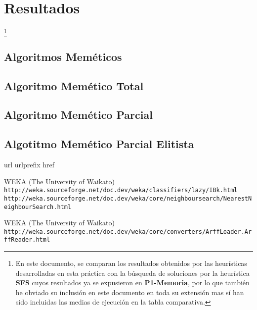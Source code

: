 \documentclass[a4paper, 11pt]{article}
\begin{document}
	\section{Resultados}\footnote{En este documento, se comparan los resultados obtenidos por las
	heurísticas desarrolladas en esta práctica con la búsqueda de soluciones por la heurística
	\textbf{SFS} cuyos resultados ya se expusieron en \textbf{P1-Memoria}, por lo que también he
	obviado su inclusión en este documento en toda su extensión mas sí han sido incluidas las medias
	de ejecución en la tabla comparativa.}
	
		\subsection{Algoritmos Meméticos}
		\subsection{Algoritmo Memético Total}
		\subsection{Algoritmo Memético Parcial}
		\subsection{Algotitmo Memético Parcial Elitista}
		
	
	
	\newpage
	
	\begin{thebibliography}{10}
	\expandafter\ifx\csname url\endcsname\relax
	  \def\url#1{\texttt{#1}}\fi
	\expandafter\ifx\csname urlprefix\endcsname\relax\def\urlprefix{URL }\fi
	\expandafter\ifx\csname href\endcsname\relax
	  \def\href#1#2{#2} \def\path#1{#1}\fi
	
	WEKA (The University of Waikato)\\
	  \url{http://weka.sourceforge.net/doc.dev/weka/classifiers/lazy/IBk.html}\\
	  \url{http://weka.sourceforge.net/doc.dev/weka/core/neighboursearch/NearestNeighbourSearch.html}
	  
  	WEKA (The University of Waikato)\\
	  \url{http://weka.sourceforge.net/doc.dev/weka/core/converters/ArffLoader.ArffReader.html}
	  
	\end{thebibliography}
\end{document}
